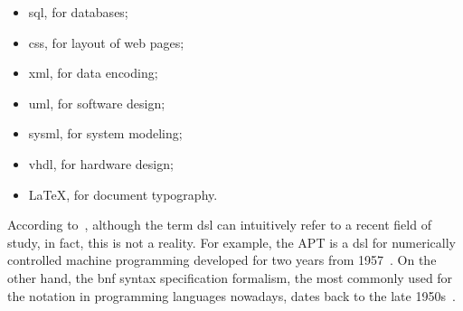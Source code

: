 \begin{itemize}
     \item \ac{sql}, for databases;
     \item \ac{css}, for layout of web pages;
     \item \ac{xml}, for data encoding;
     \item \ac{uml}, for software design;
     \item \ac{sysml}, for system modeling;
     \item \ac{vhdl}, for hardware design;
     \item \LaTeX, for document typography.
\end{itemize}

According to~\cite{Faveri:2013}, although the term \ac{dsl} can intuitively refer to a recent field of study, in fact, this is not a reality.
For example, the APT is a \ac{dsl} for numerically controlled machine programming developed for two years from 1957~\cite{Ross:1978}. 
On the other hand, the \ac{bnf} syntax specification formalism, the most commonly used for the notation in programming languages nowadays, dates back to the late 1950s~\cite{Backus:1959}.
    
